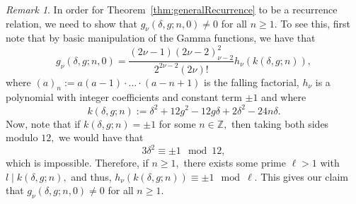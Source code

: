 \documentclass[10pt]{amsart}
\theoremstyle{definition}
\theoremstyle{remark}
\newtheorem*{remark}{Remark}
\numberwithin{equation}{section}
\newcommand{\Z}{\mathbb Z}
\begin{document}
	\begin{remark}
		In order for Theorem~\ref{thm:generalRecurrence} to be a recurrence relation, we need to show that $g_\nu(\delta,g;n,0)\neq 0$ for all $n\geq 1.$ To see this, first note that by basic manipulation of the Gamma functions, we have that
		$$
		g_\nu(\delta,g;n,0)=\frac{(2\nu-1)(2\nu-2)_{\nu-2}^2}{2^{2\nu-2}(2\nu)!}h_\nu(k(\delta,g;n)),
		$$
		where $(a)_n:=a(a-1)\cdot\ldots\cdot(a-n+1)$ is the falling factorial, $h_\nu$ is a polynomial with integer coefficients and constant term $\pm1$ and where 
		$$
		k(\delta,g;n):=\delta^2+12g^2-12g\delta+2\delta^2-24n\delta.
		$$
		Now, note that if $k(\delta,g;n)=\pm1$ for some $n\in\Z,$ then taking both sides modulo $12,$ we would have that
		$$
		3\delta^2\equiv\pm1\mod 12,
		$$
		which is impossible. Therefore, if $n\geq 1,$ there exists some prime $\ell>1$ with $l\mid k(\delta,g;n),$ and thus, $h_\nu(k(\delta,g;n))\equiv\pm1\mod\ell.$ This gives our claim that $g_\nu(\delta,g;n,0)\neq 0$ for all $n\geq 1.$
	\end{remark}
	
\end{document}
